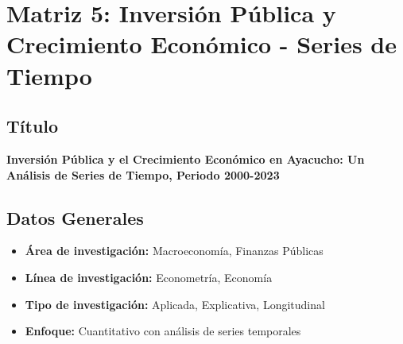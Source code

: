 \documentclass[
  man,
  floatsintext,
  longtable,
  a4paper,
  nolmodern,
  notxfonts,
  notimes,
  12pt,
  colorlinks=true,linkcolor=blue,citecolor=blue,urlcolor=blue]{apa7}
\providecommand{\tightlist}{%
  \setlength{\itemsep}{0pt}\setlength{\parskip}{0pt}}
\begin{document}
\section{Matriz 5: Inversión Pública y Crecimiento Económico - Series de
Tiempo}\label{matriz-5-inversiuxf3n-puxfablica-y-crecimiento-econuxf3mico---series-de-tiempo}

\subsection{Título}\label{tuxedtulo-4}

\textbf{Inversión Pública y el Crecimiento Económico en Ayacucho: Un
Análisis de Series de Tiempo, Periodo 2000-2023}

\subsection{Datos Generales}\label{datos-generales-4}

\begin{itemize}
\tightlist
\item
  \textbf{Área de investigación:} Macroeconomía, Finanzas Públicas
\item
  \textbf{Línea de investigación:} Econometría, Economía
\item
  \textbf{Tipo de investigación:} Aplicada, Explicativa, Longitudinal
\item
  \textbf{Enfoque:} Cuantitativo con análisis de series temporales
\end{itemize}
\end{document}
